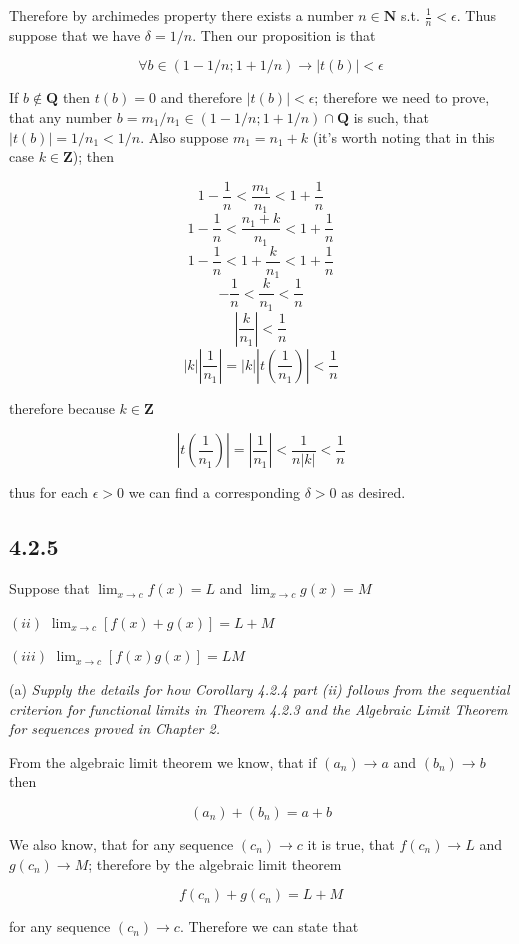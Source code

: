\documentclass[11pt,oneside,titlepage]{book}
\begin{document}
Therefore by archimedes property there exists a number $n \in \textbf{N}$ s.t. $\frac{1}{n} < \epsilon$.
Thus suppose that we have $\delta = 1/n$. Then our proposition is that 

$$\forall b \in (1 - 1/n; 1 + 1/n) \to |t(b)| < \epsilon$$

If $b \notin \textbf{Q} $ then $t(b) = 0$ and therefore $|t(b)| < \epsilon$; therefore we need to prove,
that any number $b = m_1/n_1 \in (1 - 1/n; 1 + 1/n) \cap \textbf{Q}$ is such, that $|t(b)| = 1/n_1 < 1/n$.
Also suppose $m_1 = n_1 + k$ (it's worth noting that in this case $k \in \textbf{Z}$); then

$$ 1 - \frac{1}{n} < \frac{m_1}{n_1} < 1 + \frac{1}{n}$$
$$ 1 - \frac{1}{n} < \frac{n_1 + k}{n_1} < 1 + \frac{1}{n}$$
$$ 1 - \frac{1}{n} < 1 + \frac{k}{n_1} < 1 + \frac{1}{n}$$
$$ - \frac{1}{n} <  \frac{k}{n_1} <  \frac{1}{n}$$
$$ |\frac{k}{n_1}| <  \frac{1}{n}$$
$$ |k||\frac{1}{n_1}| = |k||t(\frac{1}{n_1})| <  \frac{1}{n}$$

therefore because $k \in \textbf{Z}$

$$ |t(\frac{1}{n_1})| = |\frac{1}{n_1}| <  \frac{1}{n|k|} < \frac{1}{n}$$

thus for each $\epsilon > 0$ we can find a corresponding $\delta > 0$ as desired.

\subsection*{4.2.5}
Suppose that $\lim_{x \to c} f(x) = L$ and $\lim_{x \to c} g(x) = M$

$(ii)$ $\lim_{x \to c}[f(x) + g(x)] = L + M$

$(iii)$ $\lim_{x \to c}[f(x) g(x)] = L M$

(a)\textit{ Supply the details for how Corollary 4.2.4 part (ii) follows from the sequential criterion for functional limits in Theorem 4.2.3 and the Algebraic Limit Theorem for sequences proved in Chapter 2.}

From the algebraic limit theorem we know, that if $(a_n) \to a$ and $(b_n) \to b$ then

$$(a_n) + (b_n) = a + b$$

We also know, that for any sequence $(c_n) \to c$ it is true, that $f(c_n) \to L$ and $g(c_n) \to M$;
therefore by the algebraic limit theorem

$$f(c_n) + g(c_n) = L + M$$

for any sequence $(c_n) \to c$. Therefore we can state that
\end{document}
